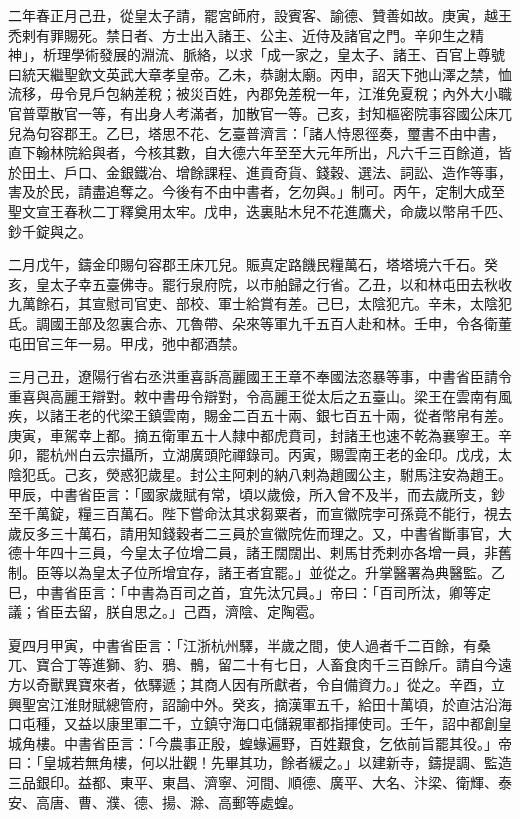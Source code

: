 
\begin{pinyinscope}

 二年春正月己丑，從皇太子請，罷宮師府，設賓客、諭德、贊善如故。庚寅，越王禿剌有罪賜死。禁日者、方士出入諸王、公主、近侍及諸官之門。辛卯生之精神」，析理學術發展的淵流、脈絡，以求「成一家之，皇太子、諸王、百官上尊號曰統天繼聖欽文英武大章孝皇帝。乙未，恭謝太廟。丙申，詔天下弛山澤之禁，恤流移，毋令見戶包納差稅；被災百姓，內郡免差稅一年，江淮免夏稅；內外大小職官普覃散官一等，有出身人考滿者，加散官一等。己亥，封知樞密院事容國公床兀兒為句容郡王。乙巳，塔思不花、乞臺普濟言：「諸人恃恩徑奏，璽書不由中書，直下翰林院給與者，今核其數，自大德六年至至大元年所出，凡六千三百餘道，皆於田土、戶口、金銀鐵冶、增餘課程、進貢奇貨、錢穀、選法、詞訟、造作等事，害及於民，請盡追奪之。今後有不由中書者，乞勿與。」制可。丙午，定制大成至聖文宣王春秋二丁釋奠用太牢。戊申，迭裏貼木兒不花進鷹犬，命歲以幣帛千匹、鈔千錠與之。



 二月戊午，鑄金印賜句容郡王床兀兒。賑真定路饑民糧萬石，塔塔境六千石。癸亥，皇太子幸五臺佛寺。罷行泉府院，以市舶歸之行省。乙丑，以和林屯田去秋收九萬餘石，其宣慰司官吏、部校、軍士給賞有差。己巳，太陰犯亢。辛未，太陰犯氐。調國王部及忽裏合赤、兀魯帶、朵來等軍九千五百人赴和林。壬申，令各衛董屯田官三年一易。甲戌，弛中都酒禁。



 三月己丑，遼陽行省右丞洪重喜訴高麗國王王章不奉國法恣暴等事，中書省臣請令重喜與高麗王辯對。敕中書毋令辯對，令高麗王從太后之五臺山。梁王在雲南有風疾，以諸王老的代梁王鎮雲南，賜金二百五十兩、銀七百五十兩，從者幣帛有差。庚寅，車駕幸上都。摘五衛軍五十人隸中都虎賁司，封諸王也速不乾為襄寧王。辛卯，罷杭州白云宗攝所，立湖廣頭陀禪錄司。丙寅，賜雲南王老的金印。戊戌，太陰犯氐。己亥，熒惑犯歲星。封公主阿剌的納八剌為趙國公主，駙馬注安為趙王。甲辰，中書省臣言：「國家歲賦有常，頃以歲儉，所入曾不及半，而去歲所支，鈔至千萬錠，糧三百萬石。陛下嘗命汰其求芻粟者，而宣徽院孛可孫竟不能行，視去歲反多三十萬石，請用知錢穀者二三員於宣徽院佐而理之。又，中書省斷事官，大德十年四十三員，今皇太子位增二員，諸王闊闊出、剌馬甘禿剌亦各增一員，非舊制。臣等以為皇太子位所增宜存，諸王者宜罷。」並從之。升掌醫署為典醫監。乙巳，中書省臣言：「中書為百司之首，宜先汰冗員。」帝曰：「百司所汰，卿等定議；省臣去留，朕自思之。」己酉，濟陰、定陶雹。



 夏四月甲寅，中書省臣言：「江浙杭州驛，半歲之間，使人過者千二百餘，有桑兀、寶合丁等進獅、豹、鴉、鶻，留二十有七日，人畜食肉千三百餘斤。請自今遠方以奇獸異寶來者，依驛遞；其商人因有所獻者，令自備資力。」從之。辛酉，立興聖宮江淮財賦總管府，詔諭中外。癸亥，摘漢軍五千，給田十萬頃，於直沽沿海口屯種，又益以康里軍二千，立鎮守海口屯儲親軍都指揮使司。壬午，詔中都創皇城角樓。中書省臣言：「今農事正殷，蝗蝝遍野，百姓艱食，乞依前旨罷其役。」帝曰：「皇城若無角樓，何以壯觀！先畢其功，餘者緩之。」以建新寺，鑄提調、監造三品銀印。益都、東平、東昌、濟寧、河間、順德、廣平、大名、汴梁、衛輝、泰安、高唐、曹、濮、德、揚、滁、高郵等處蝗。




\end{pinyinscope}
